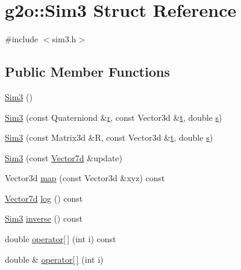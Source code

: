 \hypertarget{structg2o_1_1_sim3}{}\section{g2o\+:\+:Sim3 Struct Reference}
\label{structg2o_1_1_sim3}


{\ttfamily \#include $<$sim3.\+h$>$}

\subsection*{Public Member Functions}
\begin{DoxyCompactItemize}
\item 
\mbox{\hyperlink{structg2o_1_1_sim3_adf1277575fc039d1ae643ae018e464fe}{Sim3}} ()
\item 
\mbox{\hyperlink{structg2o_1_1_sim3_a3f7bc6953078a87865575192221def7e}{Sim3}} (const Quaterniond \&\mbox{\hyperlink{structg2o_1_1_sim3_a55dbe5c6ffe22526f20e05f0c23aa832}{r}}, const Vector3d \&\mbox{\hyperlink{structg2o_1_1_sim3_a3ef879fb13b88732428bd2f2a558d11c}{t}}, double \mbox{\hyperlink{structg2o_1_1_sim3_a2cad7c49340494d4bdd28a497e4cb486}{s}})
\item 
\mbox{\hyperlink{structg2o_1_1_sim3_a8163b7b417a91a758b10593929bae6c5}{Sim3}} (const Matrix3d \&R, const Vector3d \&\mbox{\hyperlink{structg2o_1_1_sim3_a3ef879fb13b88732428bd2f2a558d11c}{t}}, double \mbox{\hyperlink{structg2o_1_1_sim3_a2cad7c49340494d4bdd28a497e4cb486}{s}})
\item 
\mbox{\hyperlink{structg2o_1_1_sim3_a252f62d72e8449ecc929a6ca0320fcbc}{Sim3}} (const \mbox{\hyperlink{namespaceg2o_a4740ec41130f2ecc628c81f71261c8de}{Vector7d}} \&update)
\item 
Vector3d \mbox{\hyperlink{structg2o_1_1_sim3_a577ba985864cab536688123df6063b39}{map}} (const Vector3d \&xyz) const
\item 
\mbox{\hyperlink{namespaceg2o_a4740ec41130f2ecc628c81f71261c8de}{Vector7d}} \mbox{\hyperlink{structg2o_1_1_sim3_a63fedc1606012b8ce197554f6489080b}{log}} () const
\item 
\mbox{\hyperlink{structg2o_1_1_sim3}{Sim3}} \mbox{\hyperlink{structg2o_1_1_sim3_aad881b9ea79640adac90d8ae58b4a5f0}{inverse}} () const
\item 
double \mbox{\hyperlink{structg2o_1_1_sim3_a39eb382deb0f9c006d18b9e5241ac076}{operator\mbox{[}$\,$\mbox{]}}} (int i) const
\item 
double \& \mbox{\hyperlink{structg2o_1_1_sim3_ac48ebd09209c2484896f2dfe8bc673bf}{operator\mbox{[}$\,$\mbox{]}}} (int i)

\end{DoxyCompactItemize}
